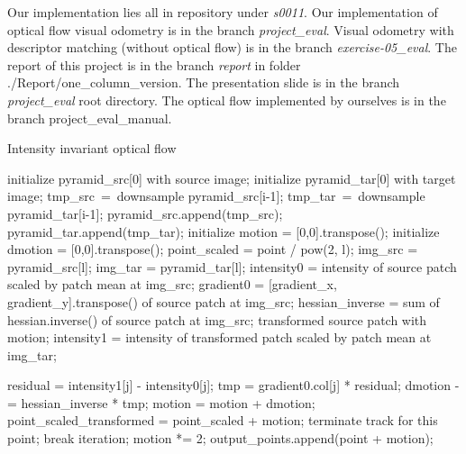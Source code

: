 \documentclass{easychair}
\begin{document}
\begin{appendices}
	Our implementation lies all in repository under \emph{s0011}. Our implementation of optical flow visual odometry is in the branch \emph{project\_eval}. Visual odometry with descriptor matching (without optical flow) is in the branch \emph{exercise-05\_eval}. The report of this project is in the branch \emph{report} in folder ./Report/one\_column\_version. The presentation slide is in the branch \emph{project\_eval} root directory. The optical flow implemented by ourselves is in the branch project\_eval\_manual.
	
	\begin{algorithm}[h]
		\caption{Intensity invariant optical flow}  
		\label{alg:optf}
		\begin{algorithmic}[1]
			\State initialize pyramid\_src[0] with source image;
			\State initialize pyramid\_tar[0] with target image;
			\State tmp\_src\ =\ downsample pyramid\_src[i-1];
			\State tmp\_tar\ =\ downsample pyramid\_tar[i-1];
			\State pyramid\_src.append(tmp\_src);
			\State pyramid\_tar.append(tmp\_tar);
			\EndFor
			\State initialize motion = [0,0].transpose();
			\State initialize dmotion = [0,0].transpose();
			\State point\_scaled = point / pow(2, l);
			\State img\_src = pyramid\_src[l];
			\State img\_tar = pyramid\_tar[l];
			\State intensity0 = intensity of source patch scaled by patch mean at img\_src;
			\State gradient0 = [gradient\_x, gradient\_y].transpose() of source patch at img\_src;
			\State hessian\_inverse = sum of hessian.inverse() of source patch at img\_src;
			\State transformed source patch with motion;
			\State intensity1 = intensity of transformed patch scaled by patch mean at img\_tar;
			
			\State residual = intensity1[j] - intensity0[j];
			\State tmp = gradient0.col[j] * residual;
			\State dmotion -= hessian\_inverse * tmp;
			\EndFor
			\State motion = motion + dmotion;
			\State point\_scaled\_transformed = point\_scaled + motion;
			\State terminate track for this point;
			\EndIf
			\State break iteration;
			\EndIf
			\EndFor
			\State motion *= 2;      
			\EndFor 
			\State output\_points.append(point + motion);
			\EndFor 
		\end{algorithmic}  
		
	\end{algorithm}  
	
\end{appendices}


%
%
%
%
%
\end{document}
